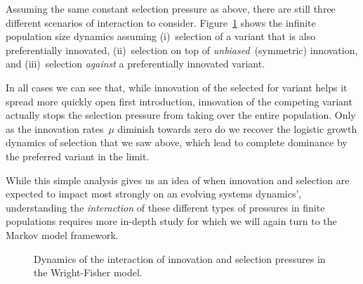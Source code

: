 Assuming the same constant selection pressure as above, there are still three different scenarios of interaction to consider. Figure~\ref{fig:mutationselectioninteraction} shows the infinite population size dynamics assuming (i)~selection of a variant that is also preferentially innovated, (ii)~selection on top of \emph{unbiased}~(symmetric) innovation, and (iii)~selection \emph{against} a preferentially innovated variant.

In all cases we can see that, while innovation of the selected for variant helps it spread more quickly open first introduction, innovation of the competing variant actually stops the selection pressure from taking over the entire population. Only as the innovation rates~$\mu$ diminish towards zero do we recover the logistic growth dynamics of selection that we saw above, which lead to complete dominance by the preferred variant in the limit.

While this simple analysis gives us an idea of when innovation and selection are expected to impact most strongly on an evolving systems dynamics', understanding the \emph{interaction} of these different types of pressures in finite populations requires more in-depth study for which we will again turn to the Markov model framework.

\begin{knitrout}
\color{fgcolor}\begin{figure}[htbp]

{\centering {}

}

\caption[Dynamics of the interaction of innovation and selection pressures in the Wright-Fisher model]{Dynamics of the interaction of innovation and selection pressures in the Wright-Fisher model.}\label{fig:mutationselectioninteraction}
\end{figure}


\end{knitrout}

